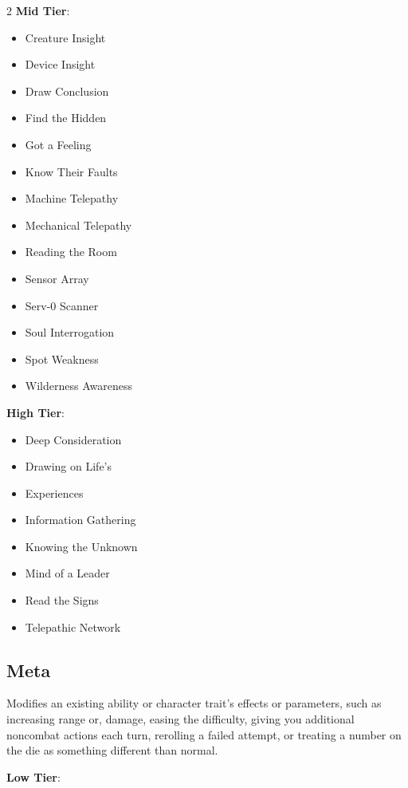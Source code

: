 \begin{multicols}{2}
\textbf{Mid Tier}:

\begin{itemize}
\item Creature Insight
\item Device Insight
\item Draw Conclusion
\item Find the Hidden
\item Got a Feeling
\item Know Their Faults
\item Machine Telepathy
\item Mechanical Telepathy 
\item Reading the Room
\item Sensor Array
\item Serv-0 Scanner
\item Soul Interrogation
\item Spot Weakness
\item Wilderness Awareness
\end{itemize}

\textbf{High Tier}:

\begin{itemize}
\item Deep Consideration
\item Drawing on Life’s
\item Experiences
\item Information Gathering
\item Knowing the Unknown
\item Mind of a Leader
\item Read the Signs
\item Telepathic Network
\end{itemize}

\subsection{Meta}

Modifies an existing ability or character trait’s effects or parameters, such as increasing range or, damage, easing the difficulty, giving you additional noncombat actions each turn, rerolling a failed attempt, or treating a number on the die as something different than normal.

\textbf{Low Tier}:


\end{multicols}
